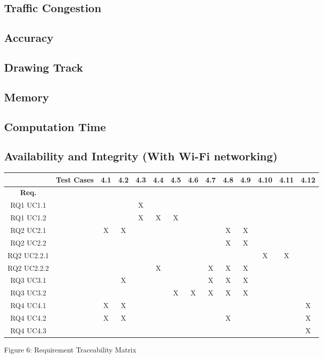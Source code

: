 \documentclass[12pt, a4paper]{article}
\begin{document}
			\subsection{Traffic Congestion} %
			\subsection{Accuracy} %
			\subsection{Drawing Track} %
			\subsection{Memory} %
			\subsection{Computation Time} %
			\subsection{Availability and Integrity (With Wi-Fi networking)} %
\begin{flushleft}
\begin{tabular}{|c|c|c|c|c|c|c|c|c|c|c|c|c|c|}

\hline
 & \textbf{Test Cases} & 4.1 & 4.2 & 4.3 & 4.4 & 4.5 & 4.6 & 4.7 & 4.8 & 4.9 & 4.10 & 4.11 & 4.12 \\
\hline
\textbf{Req.} & & & & & & & & & & & & & \\
\hline
RQ1 UC1.1 & & & & X & & & & & & & & & \\
\hline
RQ1 UC1.2 & & & & X & X & X & & & & & & & \\
\hline
RQ2 UC2.1 &  & X & X & & & & &  & X & X & & & \\
\hline
RQ2 UC2.2 & & & & & & & & & X & X & & & \\
\hline
RQ2 UC2.2.1 & & & & & & & & & & & X & X & \\
\hline
RQ2 UC2.2.2 & & & & & X & & & X & X & X & & & \\
\hline
RQ3 UC3.1 & & & X & & & & & X & X & X & & & \\
\hline
RQ3 UC3.2 & & & & & & X & X & X & X & X & & & \\
\hline
RQ4 UC4.1 & & X & X & & & & & & & & & & X \\
\hline
RQ4 UC4.2 & & X & X & & & & & & X & & & & X \\
\hline
RQ4 UC4.3 & & & & & & & & & & & & & X \\
\hline
\end{tabular}
Figure 6: Requirement Traceability Matrix
\end{flushleft}	
\end{document}
